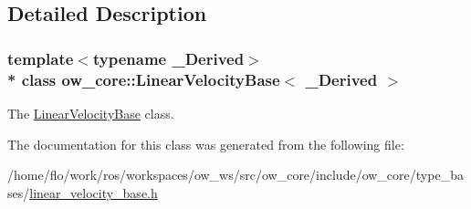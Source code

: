 \subsection{Detailed Description}
\subsubsection*{template$<$typename \+\_\+\+Derived$>$\\*
class ow\+\_\+core\+::\+Linear\+Velocity\+Base$<$ \+\_\+\+Derived $>$}

The \hyperlink{classow__core_1_1LinearVelocityBase}{Linear\+Velocity\+Base} class. 

The documentation for this class was generated from the following file\+:\begin{DoxyCompactItemize}
\item 
/home/flo/work/ros/workspaces/ow\+\_\+ws/src/ow\+\_\+core/include/ow\+\_\+core/type\+\_\+bases/\hyperlink{linear__velocity__base_8h}{linear\+\_\+velocity\+\_\+base.\+h}\end{DoxyCompactItemize}
